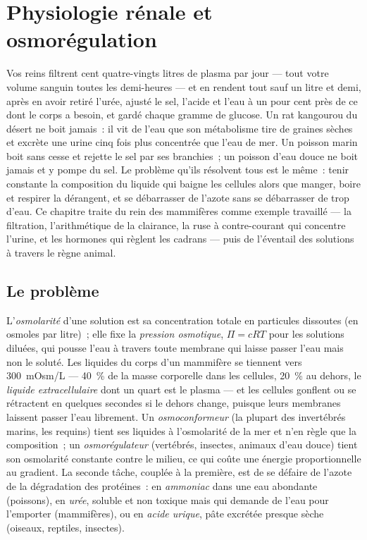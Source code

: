 \chapter{Physiologie rénale et osmorégulation}\label{ch:b3:renal-osmoregulation}

Vos reins filtrent cent quatre-vingts litres de plasma par jour --- tout
votre volume sanguin toutes les demi-heures --- et en rendent tout sauf
un litre et demi, après en avoir retiré l'urée, ajusté le sel, l'acide
et l'eau à un pour cent près de ce dont le corps a besoin, et gardé
chaque gramme de glucose. Un rat kangourou du désert ne boit jamais~: il
vit de l'eau que son métabolisme tire de graines sèches et excrète une
urine cinq fois plus concentrée que l'eau de mer. Un poisson marin boit
sans cesse et rejette le sel par ses branchies~; un poisson d'eau douce
ne boit jamais et y pompe du sel. Le problème qu'ils résolvent tous est
le même~: tenir constante la composition du liquide qui baigne les
cellules alors que manger, boire et respirer la dérangent, et se
débarrasser de l'azote sans se débarrasser de trop d'eau. Ce chapitre
traite du rein des mammifères comme exemple travaillé --- la filtration,
l'arithmétique de la clairance, la ruse à contre-courant qui concentre
l'urine, et les hormones qui règlent les cadrans --- puis de l'éventail
des solutions à travers le règne animal.

\section{Le problème}

\begin{definition}[L'osmorégulation]\label{def:b3:renal-osmoregulation:problem}
L'\emph{osmolarité} d'une solution est sa concentration totale en
particules dissoutes (en osmoles par litre)~; elle fixe la \emph{pression
osmotique}, $\Pi = cRT$ pour les solutions diluées, qui pousse l'eau à
travers toute membrane qui laisse passer l'eau mais non le soluté. Les
liquides du corps d'un mammifère se tiennent vers \qty{300}{mOsm/L} ---
\qty{40}{\%} de la masse corporelle dans les cellules, \qty{20}{\%} au
dehors, le \emph{liquide extracellulaire} dont un quart est le plasma
--- et les cellules gonflent ou se rétractent en quelques secondes si le
dehors change, puisque leurs membranes laissent passer l'eau librement.
Un \emph{osmoconformeur} (la plupart des invertébrés marins, les requins)
tient ses liquides à l'osmolarité de la mer et n'en règle que la
composition~; un \emph{osmorégulateur} (vertébrés, insectes, animaux
d'eau douce) tient son osmolarité constante contre le milieu, ce qui
coûte une énergie proportionnelle au gradient. La seconde tâche, couplée
à la première, est de se défaire de l'azote de la dégradation des
protéines~: en \emph{ammoniac} dans une eau abondante (poissons), en
\emph{urée}, soluble et non toxique mais qui demande de l'eau pour
l'emporter (mammifères), ou en \emph{acide urique}, pâte excrétée
presque sèche (oiseaux, reptiles, insectes).
\end{definition}


